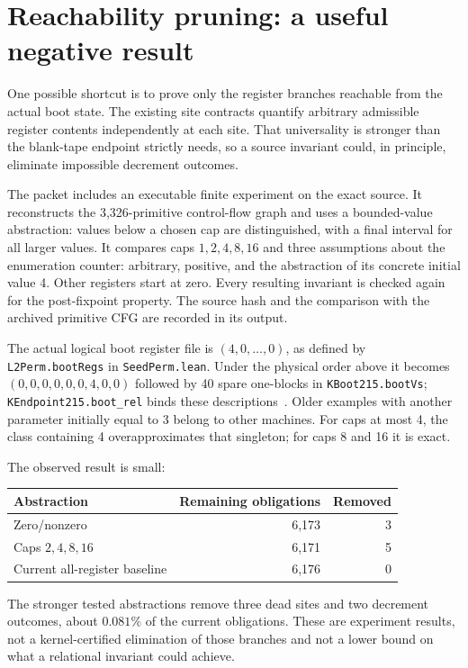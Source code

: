 \documentclass[11pt]{article}
\newcommand{\code}[1]{\texttt{\small #1}}
\begin{document}
\section{Reachability pruning: a useful negative result}
\label{sec:prune}

One possible shortcut is to prove only the register branches reachable from the actual boot state. The existing site contracts quantify arbitrary admissible register contents independently at each site. That universality is stronger than the blank-tape endpoint strictly needs, so a source invariant could, in principle, eliminate impossible decrement outcomes.

The packet includes an executable finite experiment on the exact source. It reconstructs the 3,326-primitive control-flow graph and uses a bounded-value abstraction: values below a chosen cap are distinguished, with a final interval for all larger values. It compares caps $1,2,4,8,16$ and three assumptions about the enumeration counter: arbitrary, positive, and the abstraction of its concrete initial value 4. Other registers start at zero. Every resulting invariant is checked again for the post-fixpoint property. The source hash and the comparison with the archived primitive CFG are recorded in its output.

The actual logical boot register file is $(4,0,\ldots,0)$, as defined by \code{L2Perm.bootRegs} in \code{SeedPerm.lean}. Under the physical order above it becomes $(0,0,0,0,0,0,4,0,0)$ followed by 40 spare one-blocks in \code{KBoot215.bootVs}; \code{KEndpoint215.boot\_rel} binds these descriptions~\cite{seed,boot,endpoint}. Older examples with another parameter initially equal to 3 belong to other machines. For caps at most 4, the class containing 4 overapproximates that singleton; for caps 8 and 16 it is exact.

The observed result is small:
\begin{center}
\begin{tabular}{lrr}
\toprule
Abstraction & Remaining obligations & Removed\\\midrule
Zero/nonzero & 6,173 & 3\\
Caps $2,4,8,16$ & 6,171 & 5\\
Current all-register baseline & 6,176 & 0\\\bottomrule
\end{tabular}
\end{center}
The stronger tested abstractions remove three dead sites and two decrement outcomes, about $0.081\%$ of the current obligations. These are experiment results, not a kernel-certified elimination of those branches and not a lower bound on what a relational invariant could achieve.
\end{document}
